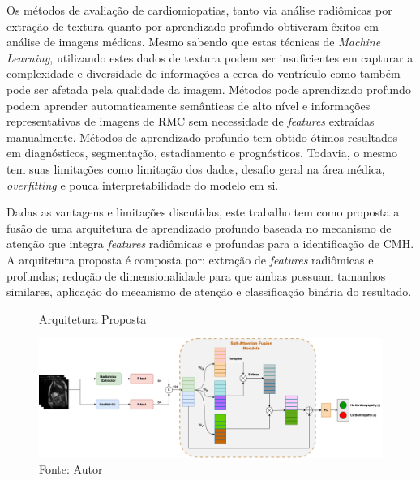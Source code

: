 Os métodos de avaliação de cardiomiopatias, tanto via análise radiômicas por extração de textura quanto por aprendizado profundo obtiveram êxitos em análise de imagens médicas. Mesmo sabendo que estas técnicas de \textit{Machine Learning}, utilizando estes dados de textura podem ser insuficientes em capturar a complexidade e diversidade de informações a cerca do ventrículo como também pode ser afetada pela qualidade da imagem. Métodos pode aprendizado profundo podem aprender automaticamente semânticas de alto nível e informações representativas de imagens de \gls{RMC} sem necessidade de \textit{features} extraídas manualmente.
Métodos de aprendizado profundo tem obtido ótimos resultados em diagnósticos, segmentação, estadiamento e prognósticos. Todavia, o mesmo tem suas limitações como limitação dos dados, desafio geral na área médica, \textit{overfitting} e pouca interpretabilidade do modelo em si.

Dadas as vantagens e limitações discutidas, este trabalho tem como proposta a fusão de uma arquitetura de aprendizado profundo baseada no mecanismo de atenção que integra \textit{features} radiômicas e profundas para a identificação de \gls{CMH}. A arquitetura proposta é composta por: extração de \textit{features} radiômicas e profundas; redução de dimensionalidade para que ambas possuam tamanhos similares, aplicação do mecanismo de atenção e classificação binária do resultado. 

\begin{figure}[htbp]
    \centering
    \caption{Arquitetura Proposta}
    \includegraphics[width=1\textwidth]{figures/fig011.png}
    \caption*{Fonte: Autor}
    \label{fig:fig011-01}
\end{figure}
